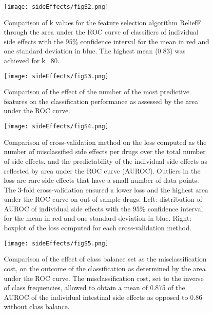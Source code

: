 \clearpage
\begin{figure}[!htp]
\centering
	\texttt{[image: sideEffects/figS2.png]}%
	\caption[ReliefF's k value comparison.]{Comparison of k values for the feature selection algorithm ReliefF through the area under the ROC curve of classifiers of individual side effects with the 95\% confidence interval for the mean in red and one standard deviation in blue. The highest mean (0.83) was achieved for k=80.}
	\label{fig:s2seff}
\end{figure}

\clearpage
\begin{figure}[!htp]
\centering
	\texttt{[image: sideEffects/figS3.png]}%
	\caption[Comparison of the number of selected features.]{Comparison of the effect of the number of the most predictive features on the classification performance as assessed by the area under the ROC curve.}
	\label{fig:s3seff}
\end{figure}

\clearpage
\begin{figure}[!htp]
\centering
	\texttt{[image: sideEffects/figS4.png]}%
	\caption[Assessment of the cross-validation loss.]{Comparison of cross-validation method on the loss computed as the number of misclassified side effects per drugs over the total number of side effects, and the predictability of the individual side effects as reflected by area under the ROC curve (AUROC). Outliers in the loss are rare side effects that have a small number of data points. The 3-fold cross-validation ensured a lower loss and the highest area under the ROC curve on out-of-sample drugs. Left: distribution of AUROC of individual side effects with the 95\% confidence interval for the mean in red and one standard deviation in blue. Right: boxplot of the loss computed for each cross-validation method.}
	\label{fig:s4seff}
\end{figure}

\clearpage
\begin{figure}[!htp]
\centering
	\texttt{[image: sideEffects/figS5.png]}%
	\caption[Effect of class balance.]{Comparison of the effect of class balance set as the misclassification cost, on the outcome of the classification as determined by the area under the ROC curve. The misclassification cost, set to the inverse of class frequencies, allowed to obtain a mean of 0.875 of the AUROC of the individual intestinal side effects as opposed to 0.86 without class balance.}
	\label{fig:s5seff}
\end{figure}

